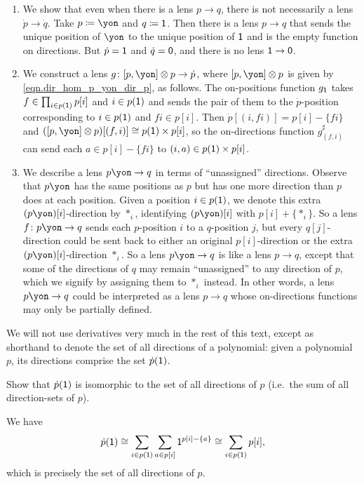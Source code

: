 \documentclass[Book-Poly]{subfiles}
\begin{document}
\begin{exercise}
\begin{solution}
\begin{enumerate}
	\item We show that even when there is a lens $p \to q$, there is not necessarily a lens $\dot{p}\to\dot{q}$.
	Take $p \coloneqq \yon$ and $q \coloneqq \textsf{1}$.
	Then there is a lens $p \to q$ that sends the unique position of $\yon$ to the unique position of $\textsf{1}$ and is the empty function on directions.
	But $\dot{p} = \textsf{1}$ and $\dot{q} = \textsf{0}$, and there is no lens $\textsf{1} \to \textsf{0}$.

	\item We construct a lens $g\colon\ihom{p,\yon}\otimes p\to \dot{p}$, where $\ihom{p,\yon} \otimes p$ is given by \eqref{eqn.dir_hom_p_yon_dir_p}, as follows.
	The on-positions function $g_{\textsf{1}}$ takes $f\in\prod_{i\in p(\textsf{1})}p[i]$ and $i\in p(\textsf{1})$ and sends the pair of them to the $\dot{p}$-position corresponding to $i\in p(\textsf{1})$ and $fi\in p[i]$.
	Then $\dot{p}[(i, fi)]=p[i]-\{fi\}$ and $(\ihom{p,\yon}\otimes p)[(f, i)]\iso p(\1)\times p[i]$, so the on-directions function $g^\sharp_{(f,i)}$ can send each $a\in p[i]-\{fi\}$ to $(i,a)\in p(\textsf{1})\times p[i]$.

	\item We describe a lens $p\yon\to q$ in terms of ``unassigned'' directions.
	Observe that $p\yon$ has the same positions as $p$ but has one more direction than $p$ does at each position.
	Given a position $i\in p(\textsf{1})$, we denote this extra $(p\yon)[i]$-direction by $\ast_i$, identifying $(p\yon)[i]$ with $p[i]+\{\ast_i\}$.
	So a lens $f\colon p\yon\to q$ sends each $p$-position $i$ to a $q$-position $j$, but every $q[j]$-direction could be sent back to either an original $p[i]$-direction or the extra $(p\yon)[i]$-direction $\ast_i$.
	So a lens $p\yon\to q$ is like a lens $p\to q$, except that some of the directions of $q$ may remain ``unassigned'' to any direction of $p$, which we signify by assigning them to $\ast_i$ instead.
  In other words, a lens $p\yon\to q$ could be interpreted as a lens $p\to q$ whose on-directions functions may only be partially defined.
\end{enumerate}
\end{solution}
\end{exercise}

We will not use derivatives very much in the rest of this text, except as shorthand to denote the set of all directions of a polynomial: given a polynomial $p$, its directions comprise the set $\dot{p}(\textsf{1})$.

\begin{exercise} \label{exc.deriv-directions}
  Show that $\dot{p}(\textsf{1})$ is isomorphic to the set of all directions of $p$ (i.e.\ the sum of all direction-sets of $p$).
  \begin{solution}
    We have
    \[
      \dot{p}(\textsf{1})\cong\sum_{i\in p(\textsf{1})}\sum_{a\in p[i]}\textsf{1}^{p[i]-\{a\}} \cong \sum_{i \in p(\textsf{1})} p[i],
    \]
    which is precisely the set of all directions of $p$.
  \end{solution}
\end{exercise}
\end{document}
